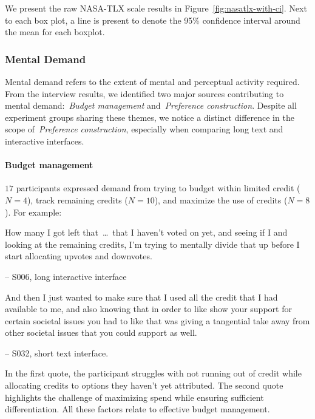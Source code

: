 We present the raw NASA-TLX scale results in Figure~\ref{fig:nasatlx-with-ci}. Next to each box plot, a line is present to denote the 95\% confidence interval around the mean for each boxplot.

\subsubsection{Mental Demand}
Mental demand refers to the extent of mental and perceptual activity required. From the interview results, we identified two major sources contributing to mental demand:~\textit{Budget management} and~\textit{Preference construction}. Despite all experiment groups sharing these themes, we notice a distinct difference in the scope of~\textit{Preference construction}, especially when comparing long text and interactive interfaces.

\paragraph{Budget management} $17$ participants expressed demand from trying to budget within limited credit ($N=4$), track remaining credits ($N=10$), and maximize the use of credits ($N=8$). For example:

\begin{displayquote}
How many I got left that~\ldots\ that I haven't voted on yet, and seeing if I and looking at the remaining credits, I'm trying to mentally divide that up before I start allocating upvotes and downvotes.

\small{\noindent \hfill -- S006, long interactive interface}
\end{displayquote}

\begin{displayquote}
And then I just wanted to make sure that I used all the credit that I had available to me, and also knowing that in order to like show your support for certain societal issues you had to like that was giving a tangential take away from other societal issues that you could support as well.
    
\noindent \hfill -- S032, short text interface.
\end{displayquote}

In the first quote, the participant struggles with not running out of credit while allocating credits to options they haven't yet attributed. The second quote highlights the challenge of maximizing spend while ensuring sufficient differentiation. All these factors relate to effective budget management.

